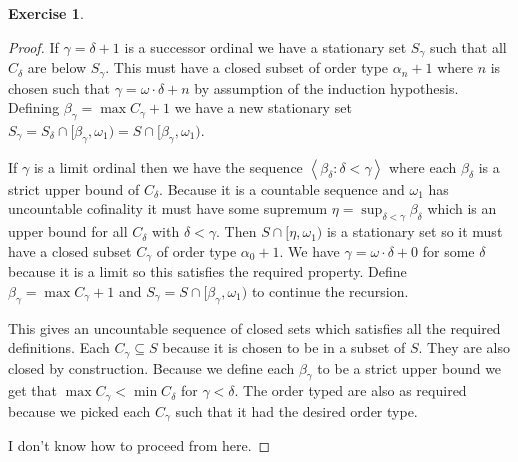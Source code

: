 \documentclass{article}
\theoremstyle{definition}
\newtheorem{question}{Exercise}
\newcommand{\sequence}[2]{\left<#1:#2\right>}
\begin{document}
\begin{question}
\begin{proof}
        If \(\gamma=\delta+1\) is a successor ordinal we have a stationary set
        \(S_{\gamma}\) such that all \(C_{\delta}\) are below \(S_{\gamma}\).
        This must have a closed subset of order type \(\alpha_{n}+1\) where
        \(n\) is chosen such that \(\gamma=\omega\cdot\delta+n\) by assumption
        of the induction hypothesis. Defining \(\beta_{\gamma}=\max
        C_{\gamma}+1\) we have a new stationary set
        \(S_{\gamma}=S_{\delta}\cap[\beta_{\gamma},\omega_{1})=S\cap[\beta_{\gamma},\omega_{1})\).

        If \(\gamma\) is a limit ordinal then we have the sequence
        \(\sequence{\beta_{\delta}}{\delta<\gamma}\) where each
        \(\beta_{\delta}\) is a strict upper bound of \(C_{\delta}\). Because it
        is a countable sequence and \(\omega_{1}\) has uncountable cofinality it
        must have some supremum \(\eta=\sup_{\delta<\gamma}\beta_{\delta}\)
        which is an upper bound for all \(C_{\delta}\) with \(\delta<\gamma\).
        Then \(S\cap [\eta,\omega_{1})\) is a stationary set so it must have a
        closed subset \(C_{\gamma}\) of order type \(\alpha_{0}+1\). We have
        \(\gamma=\omega\cdot\delta+0\) for some \(\delta\) because it is a limit
        so this satisfies the required property. Define \(\beta_{\gamma}=\max
        C_{\gamma}+1\) and \(S_{\gamma}=S\cap[\beta_{\gamma},\omega_{1})\) to
        continue the recursion.

        This gives an uncountable sequence of closed sets which satisfies all
        the required definitions. Each \(C_{\gamma}\subseteq S\) because it is
        chosen to be in a subset of \(S\). They are also closed by construction.
        Because we define each \(\beta_{\gamma}\) to be a strict upper bound we
        get that \(\max C_{\gamma}<\min C_{\delta}\) for \(\gamma<\delta\). The
        order typed are also as required because we picked each \(C_{\gamma}\)
        such that it had the desired order type.

        I don't know how to proceed from here.
    \end{proof}
\end{question}
\end{document}

